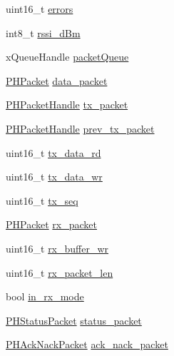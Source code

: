 \begin{DoxyCompactItemize}
\item 
uint16\-\_\-t \hyperlink{structpios__rfm22b__dev_a538dcdf62ddc3430e172d88eb252dc0d}{errors}
\item 
int8\-\_\-t \hyperlink{structpios__rfm22b__dev_a7efa2c785a1c9feaff4db472c1f22805}{rssi\-\_\-d\-Bm}
\item 
x\-Queue\-Handle \hyperlink{structpios__rfm22b__dev_ab04a8d36db91686aaf0748e5db71ca0f}{packet\-Queue}
\item 
\hyperlink{struct_p_h_packet}{\-P\-H\-Packet} \hyperlink{structpios__rfm22b__dev_a19e3336c0f0c2da02404e828d688cbd3}{data\-\_\-packet}
\item 
\hyperlink{group___tau_labs_libraries_gaa252eac3dc3346fec375be8805fd8694}{\-P\-H\-Packet\-Handle} \hyperlink{structpios__rfm22b__dev_a3b7420bb896bb0b1504c4795c8af9087}{tx\-\_\-packet}
\item 
\hyperlink{group___tau_labs_libraries_gaa252eac3dc3346fec375be8805fd8694}{\-P\-H\-Packet\-Handle} \hyperlink{structpios__rfm22b__dev_a4c0368362858e8e4450ce094670e9b3d}{prev\-\_\-tx\-\_\-packet}
\item 
uint16\-\_\-t \hyperlink{structpios__rfm22b__dev_a19f0507e484216186dab475d3d5f15a0}{tx\-\_\-data\-\_\-rd}
\item 
uint16\-\_\-t \hyperlink{structpios__rfm22b__dev_a6fa47c8dff475d9292a547732cbe4138}{tx\-\_\-data\-\_\-wr}
\item 
uint16\-\_\-t \hyperlink{structpios__rfm22b__dev_ac7ab84030bbfedd9cf397152e1d17ff9}{tx\-\_\-seq}
\item 
\hyperlink{struct_p_h_packet}{\-P\-H\-Packet} \hyperlink{structpios__rfm22b__dev_a6c8fb7a4ca0874d372ec084d2089f43c}{rx\-\_\-packet}
\item 
uint16\-\_\-t \hyperlink{structpios__rfm22b__dev_aa31cc789855ee5b29487085603190aa3}{rx\-\_\-buffer\-\_\-wr}
\item 
uint16\-\_\-t \hyperlink{structpios__rfm22b__dev_acf4806b2fb1db624e1fa47dad08ba447}{rx\-\_\-packet\-\_\-len}
\item 
bool \hyperlink{structpios__rfm22b__dev_a5d1bb77d70e2da36174e66d08e42cac6}{in\-\_\-rx\-\_\-mode}
\item 
\hyperlink{struct_p_h_status_packet}{\-P\-H\-Status\-Packet} \hyperlink{structpios__rfm22b__dev_a655ec6ecb5828af1262a9108c8fb25f7}{status\-\_\-packet}
\item 
\hyperlink{struct_p_h_ack_nack_packet}{\-P\-H\-Ack\-Nack\-Packet} \hyperlink{structpios__rfm22b__dev_a57f8d0ab5171f50e634940b11cc402c1}{ack\-\_\-nack\-\_\-packet}
\item 

\end{DoxyCompactItemize}
